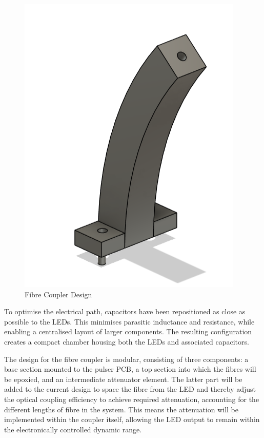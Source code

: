 \documentclass[a4paper,11pt]{article}
\begin{document}
\begin{figure}[htbp]
\centering
\includegraphics[scale=0.5]{OldFibreCouplerDesign.png}
\caption{Fibre Coupler Design\label{fig:OldFibreCouplerDesign}}
\end{figure}

To optimise the electrical path, capacitors have been repositioned as close as possible to the LEDs. This minimises parasitic inductance and resistance, while enabling a centralised layout of larger components. The resulting configuration creates a compact chamber housing both the LEDs and associated capacitors.

The design for the fibre coupler is modular, consisting of three components: a base section mounted to the pulser PCB, a top section into which the fibres will be epoxied, and an intermediate attenuator element. The latter part will be added to the current design to space the fibre from the LED and thereby adjust the optical coupling efficiency to achieve required attenuation, accounting for the different lengths of fibre in the system. This means the attenuation will be implemented within the coupler itself, allowing the LED output to remain within the electronically controlled dynamic range.
\end{document}
